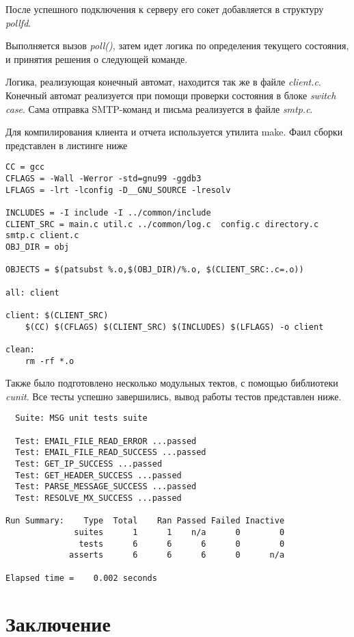 \documentclass[a4paper,12pt]{report}
\begin{document}
	После успешного подключения к серверу его сокет добавляется в структуру \textit{pollfd}.
	
	Выполняется вызов \textit{poll()}, затем идет логика по определения текущего состояния, и принятия решения о следующей команде.

	Логика, реализующая конечный автомат,
	 находится так же в файле \textit{client.c}. 
	  Конечный автомат реализуется при помощи проверки состояния в блоке \textit{switch case}. 
	  Сама отправка SMTP-команд и письма реализуется в файле \textit{smtp.c}.

	  Для компилирования клиента и отчета используется утилита make. 
	  Фаил сборки представлен в листинге ниже
	  \begin{Verbatim}
CC = gcc
CFLAGS = -Wall -Werror -std=gnu99 -ggdb3
LFLAGS = -lrt -lconfig -D__GNU_SOURCE -lresolv

INCLUDES = -I include -I ../common/include 
CLIENT_SRC = main.c util.c ../common/log.c  config.c directory.c smtp.c client.c
OBJ_DIR = obj

OBJECTS = $(patsubst %.o,$(OBJ_DIR)/%.o, $(CLIENT_SRC:.c=.o))

all: client

client: $(CLIENT_SRC)
	$(CC) $(CFLAGS) $(CLIENT_SRC) $(INCLUDES) $(LFLAGS) -o client

clean:
	rm -rf *.o

	  \end{Verbatim}

	  Также было подготовлено несколько модульных тектов, с помощью библиотеки \textit{cunit}. Все тесты успешно завершились, вывод работы тестов представлен ниже.

	  \begin{Verbatim}
  Suite: MSG unit tests suite

  Test: EMAIL_FILE_READ_ERROR ...passed
  Test: EMAIL_FILE_READ_SUCCESS ...passed
  Test: GET_IP_SUCCESS ...passed
  Test: GET_HEADER_SUCCESS ...passed
  Test: PARSE_MESSAGE_SUCCESS ...passed
  Test: RESOLVE_MX_SUCCESS ...passed

Run Summary:    Type  Total    Ran Passed Failed Inactive
              suites      1      1    n/a      0        0
               tests      6      6      6      0        0
             asserts      6      6      6      0      n/a

Elapsed time =    0.002 seconds
\end{Verbatim}

	\chapter{Заключение}
\end{document}
